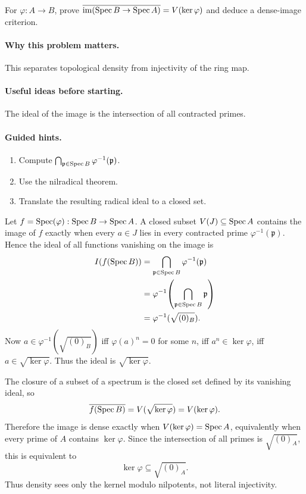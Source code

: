 \begin{problem}\label{prob:vi19-p13}
For $\varphi:A\to B$, prove $\overline{\operatorname{im}(\operatorname{Spec} B\to\operatorname{Spec} A)}=V(\ker\varphi)$ and deduce a dense-image criterion.
\end{problem}

\ifdefined\FullProblemDossiers
\paragraph{Why this problem matters.}
This separates topological density from injectivity of the ring map.

\paragraph{Useful ideas before starting.}
The ideal of the image is the intersection of all contracted primes.

\paragraph{Guided hints.}
\begin{enumerate}
\item Compute $\bigcap_{\mathfrak p\in\operatorname{Spec} B}\varphi^{-1}(\mathfrak p)$.
\item Use the nilradical theorem.
\item Translate the resulting radical ideal to a closed set.
\end{enumerate}

\begin{solution}
Let \(f=\operatorname{Spec}(\varphi):\operatorname{Spec} B\to\operatorname{Spec} A\).  A closed subset \(V(J)\subseteq\operatorname{Spec} A\) contains the image of \(f\) exactly when every \(a\in J\) lies in every contracted prime \(\varphi^{-1}(\mathfrak p)\).  Hence the ideal of all functions vanishing on the image is
\[
\begin{aligned}
I(f(\operatorname{Spec} B))
&=\bigcap_{\mathfrak p\in\operatorname{Spec} B}\varphi^{-1}(\mathfrak p)\\
&=\varphi^{-1}\!\left(\bigcap_{\mathfrak p\in\operatorname{Spec} B}\mathfrak p\right)\\
&=\varphi^{-1}(\sqrt{(0)_B}).
\end{aligned}
\]
Now \(a\in\varphi^{-1}(\sqrt{(0)_B})\) iff \(\varphi(a)^n=0\) for some \(n\), iff \(a^n\in\ker\varphi\), iff \(a\in\sqrt{\ker\varphi}\).  Thus the ideal is \(\sqrt{\ker\varphi}\).

The closure of a subset of a spectrum is the closed set defined by its vanishing ideal, so
\[
\overline{f(\operatorname{Spec} B)}
=V(\sqrt{\ker\varphi})
=V(\ker\varphi).
\]
Therefore the image is dense exactly when \(V(\ker\varphi)=\operatorname{Spec} A\), equivalently when every prime of \(A\) contains \(\ker\varphi\).  Since the intersection of all primes is \(\sqrt{(0)_A}\), this is equivalent to
\[
\boxed{\ker\varphi\subseteq\sqrt{(0)_A}.}
\]
Thus density sees only the kernel modulo nilpotents, not literal injectivity.
\end{solution}

